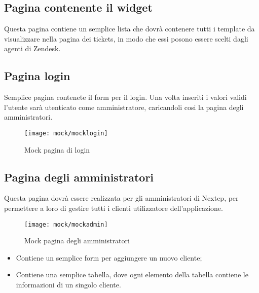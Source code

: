 \subsection{Pagina contenente il widget} Questa pagina contiene un semplice lista che dovrà contenere tutti i template da visualizzare nella pagina dei tickets, in modo che essi posono essere scelti dagli agenti di Zendesk.
\\ 
\subsection{Pagina login}
Semplice pagina contenete il form per il login. Una volta inseriti i valori validi l'utente sarà utenticato come amministratore, caricandoli cosi la pagina degli amministratori. 
\begin{figure}[!h] 
	\centering 
	\texttt{[image: mock/mocklogin]} 
	\caption{Mock pagina di login}
\end{figure}  \newpage
\subsection{Pagina degli amministratori}
Questa pagina dovrà essere realizzata per gli amministratori di Nextep, per permettere a loro di gestire tutti i clienti utilizzatore dell'applicazione. 
\begin{figure}[!h] 
	\centering 
	\texttt{[image: mock/mockadmin]} 
	\caption{Mock pagina degli amministratori}
\end{figure} 
\newpage 
\begin{itemize}
	\item Contiene un semplice form per aggiungere un nuovo cliente;
	\item Contiene una semplice tabella, dove ogni elemento della tabella contiene le informazioni di un singolo cliente.
\end{itemize}
